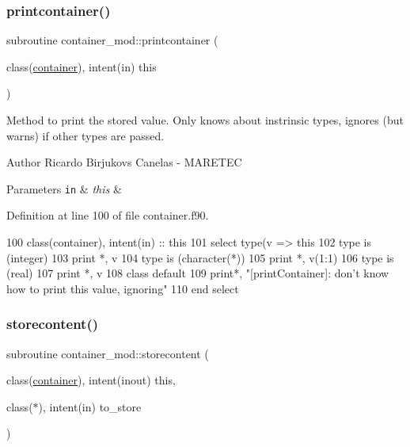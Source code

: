 \subsubsection{\texorpdfstring{printcontainer()}{printcontainer()}}
{\footnotesize\ttfamily subroutine container\+\_\+mod\+::printcontainer (\begin{DoxyParamCaption}\item[{class(\mbox{\hyperlink{structcontainer__mod_1_1container}{container}}), intent(in)}]{this }\end{DoxyParamCaption})\hspace{0.3cm}{\ttfamily [private]}}



Method to print the stored value. Only knows about instrinsic types, ignores (but warns) if other types are passed. 

\begin{DoxyAuthor}{Author}
Ricardo Birjukovs Canelas -\/ M\+A\+R\+E\+T\+EC 
\end{DoxyAuthor}

\begin{DoxyParams}[1]{Parameters}
\mbox{\tt in}  & {\em this} & \\
\hline
\end{DoxyParams}


Definition at line 100 of file container.\+f90.


\begin{DoxyCode}
100     \textcolor{keywordtype}{class}(container), \textcolor{keywordtype}{intent(in)} :: this
101     \textcolor{keywordflow}{select type}(v => this%
102 \textcolor{keywordflow}{    type is} (integer)
103         print *, v
104 \textcolor{keywordflow}{    type is} (\textcolor{keywordtype}{character}(*))
105         print *, v(1:1)
106 \textcolor{keywordflow}{    type is} (real)
107         print *, v
108 \textcolor{keywordflow}{        class default}
109         print*, \textcolor{stringliteral}{"[printContainer]: don't know how to print this value, ignoring"}
110 \textcolor{keywordflow}{    end select}
\end{DoxyCode}
\mbox{\label{namespacecontainer__mod_ace49cee012b6cd3c41c03556ab0dd884}} 
\subsubsection{\texorpdfstring{storecontent()}{storecontent()}}
{\footnotesize\ttfamily subroutine container\+\_\+mod\+::storecontent (\begin{DoxyParamCaption}\item[{class(\mbox{\hyperlink{structcontainer__mod_1_1container}{container}}), intent(inout)}]{this,  }\item[{class($\ast$), intent(in)}]{to\+\_\+store }\end{DoxyParamCaption})\hspace{0.3cm}{\ttfamily [private]}}



